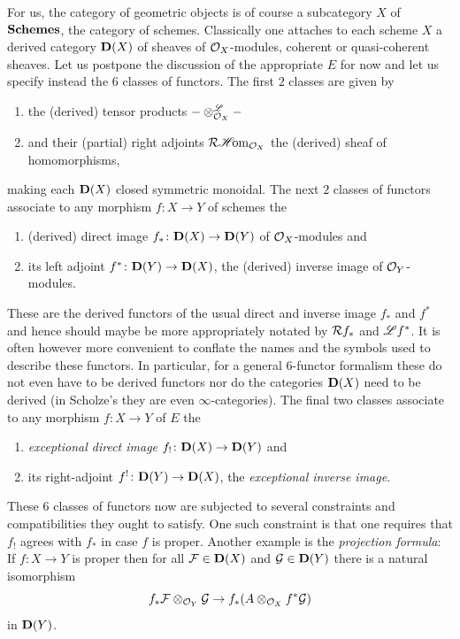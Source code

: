 
For us, the category of geometric objects is of course a subcategory $X$ of ${{\mathbf{Schemes}}}$, the category of schemes. Classically one attaches to each scheme $X$ a derived category ${{\mathbf{D}}(X)}$ of sheaves of ${{\mathcal{O}}_{X}}$-modules, \eg coherent or quasi-coherent sheaves. Let us postpone the discussion of the appropriate $E$ for now and let us specify instead the $6$ classes of functors. The first $2$ classes are given by
\begin{enumerate}
	\item
	the (derived) tensor products $-\otimes^{\mathscr{L}}_{{{\mathcal{O}}_{X}}} -$
	
	\item
	and their (partial) right adjoints $\mathcal{R}{\operatorname{\mathscr{H}\!om}}_{{{\mathcal{O}}_{X}}}$ the (derived) sheaf of homomorphisms,
\end{enumerate}
making each ${{\mathbf{D}}(X)}$ closed symmetric monoidal. The next $2$ classes of functors associate to any morphism $f\colon X\to Y$ of schemes the
\begin{enumerate}
	\item[3.]
	(derived) direct image $f_\ast\colon {{\mathbf{D}}(X)}\to {{\mathbf{D}}(Y)}$ of ${{\mathcal{O}}_{X}}$-modules and
	
	\item[4.]
	its left adjoint $f^\ast\colon {{\mathbf{D}}(Y)}\to {{\mathbf{D}}(X)}$, the (derived) inverse image of ${{\mathcal{O}}_{Y}}$-modules.
\end{enumerate}
These are the derived functors of the usual direct and inverse image $f_\ast$ and $f^\ast$ and hence should maybe be more appropriately notated by $\mathcal{R} f_\ast$ and $\mathscr{L} f^\ast$. It is often however more convenient to conflate the names and the symbols used to describe these functors. In particular, for a general $6$-functor formalism these do not even have to be derived functors nor do the categories ${{\mathbf{D}}(X)}$ need to be derived (in Scholze's \cite{sixfunctors} they are even  $\infty$-categories). The final two classes associate to any morphism $f\colon X\to Y$ of $E$ the
\begin{enumerate}
	\item[5.]
	\emph{exceptional direct image} $f_!\colon {{\mathbf{D}}(X)} \to {{\mathbf{D}}(Y)}$ and
	
	\item[6.]
	its right-adjoint $f^!\colon {{\mathbf{D}}(Y)} \to {{\mathbf{D}}(X)}$, the \emph{exceptional inverse image}.
\end{enumerate}
These $6$ classes of functors now are subjected to several constraints and compatibilities they ought to satisfy. One such constraint is that one requires that $f_!$ agrees with $f_\ast$ in case $f$ is proper. Another example is the \emph{projection formula}: If $f\colon X\to Y$ is proper then for all ${\mathcal{F}}\in{{\mathbf{D}}(X)}$ and ${\mathcal{G}}\in{{\mathbf{D}}(Y)}$ there is a natural isomorphism
$$f_\ast{\mathcal{F}}\otimes_{{\mathcal{O}}_{Y}} {\mathcal{G}} \to f_\ast(A\otimes_{{{\mathcal{O}}_{X}}} f^\ast {\mathcal{G}})$$
in ${{\mathbf{D}}(Y)}$.


